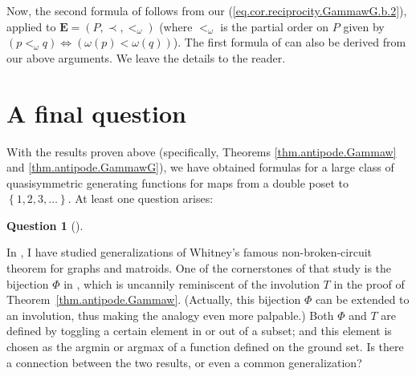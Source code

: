 \documentclass[numbers=enddot,12pt,final,onecolumn,notitlepage,abstracton]{scrartcl}
\theoremstyle{definition}
\newtheorem{quest}[theo]{Question}
\newenvironment{question}[1][]
{\begin{quest}[#1]\begin{leftbar}}
{\end{leftbar}\end{quest}}
\newcommand{\EE}{{\mathbf{E}}}
\begin{document}
Now, the second formula of \cite[Theorem 2.13]{Joch} follows from our
(\ref{eq.cor.reciprocity.GammawG.b.2}), applied to $\EE = \left(
P,\prec,<_{\omega}\right)  $ (where $<_{\omega}$ is the partial order on $P$
given by $\left(  p<_{\omega}q\right)  \Longleftrightarrow\left(
\omega\left(  p\right)  <\omega\left(  q\right)  \right)  $). The first
formula of \cite[Theorem 2.13]{Joch} can also be derived from our above
arguments. We leave the details to the reader.

\section{A final question}

With the results proven above (specifically, Theorems
\ref{thm.antipode.Gammaw} and \ref{thm.antipode.GammawG}), we have obtained
formulas for a large class of quasisymmetric generating functions for maps
from a double poset to $\left\{  1,2,3,\ldots\right\}  $. At least one
question arises:

\begin{question}
In \cite{Gri-nbc}, I have studied generalizations of Whitney's famous
non-broken-circuit theorem for graphs and matroids. One of the cornerstones of
that study is the bijection $\Phi$ in \cite[proofs of Lemma 2.8, Lemma
5.29 and Lemma 8.25]{Gri-nbc}, which is uncannily reminiscent of the
involution $T$ in the proof
of Theorem~\ref{thm.antipode.Gammaw}. (Actually, this bijection $\Phi$ can be
extended to an involution, thus making the analogy even more palpable.) Both
$\Phi$ and $T$ are defined by toggling a certain element in or out of a
subset; and this element is chosen as the argmin or argmax of a function
defined on the ground set. Is there a connection between the two results, or
even a common generalization?
\end{question}
\end{document}

